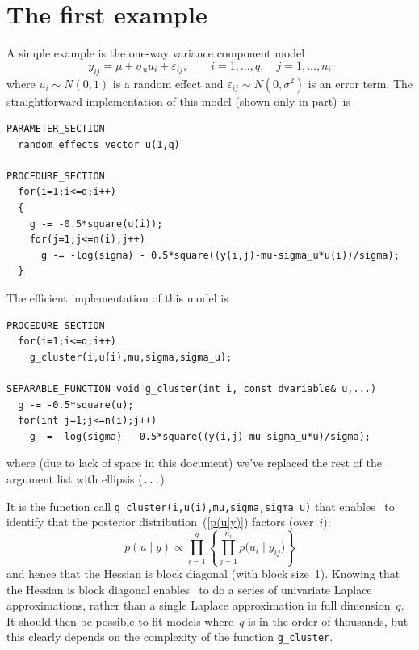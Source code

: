 \documentclass{admbmanual}
\begin{document}
\section{The first example}

A simple example is the one-way variance component model
\[
  y_{ij}=\mu +\sigma_u u_{i}+\varepsilon_{ij}, \qquad i=1,\ldots ,q,\quad j=1,\ldots ,n_{i}
\]
where $u_{i}\sim N(0,1)$ is a random effect and $\varepsilon_{ij}\sim N(0,\sigma^2)$ 
is an error term. The straightforward implementation of this model (shown only in part)~is
\begin{lstlisting}
PARAMETER_SECTION
  random_effects_vector u(1,q)

PROCEDURE_SECTION
  for(i=1;i<=q;i++)
  {
    g -= -0.5*square(u(i));
    for(j=1;j<=n(i);j++)
      g -= -log(sigma) - 0.5*square((y(i,j)-mu-sigma_u*u(i))/sigma);
  }
\end{lstlisting}
The efficient implementation of this model is 
\begin{lstlisting}
PROCEDURE_SECTION
  for(i=1;i<=q;i++)
    g_cluster(i,u(i),mu,sigma,sigma_u);

SEPARABLE_FUNCTION void g_cluster(int i, const dvariable& u,...)
  g -= -0.5*square(u);
  for(int j=1;j<=n(i);j++)
    g -= -log(sigma) - 0.5*square((y(i,j)-mu-sigma_u*u)/sigma);
\end{lstlisting}
where (due to lack of space in this document) we've replaced the rest of the argument list with ellipsis (\texttt{...}).

It is the function call \texttt{g\_cluster(i,u(i),mu,sigma,sigma\_u)} that enables \scAR\ to 
identify that the posterior distribution~(\ref{p(u|y)}) factors (over~$i$):
\[  
  p(u \mid y) \propto \prod_{i=1}^{q}\left\{ \prod_{j=1}^{n_{i}}p \bigl(u_{i} \mid y_{ij}\bigr)\right\} 
\]
and hence that the Hessian is block diagonal (with block size~1).
Knowing that the Hessian is block diagonal enables \scAR\ to do a series of univariate
Laplace approximations, rather than a single Laplace approximation in full dimension~$q$. It should
then be possible to fit models where~$q$ is in the order of thousands, but this clearly
depends on the complexity of the function \texttt{g\_cluster}.
\end{document}
